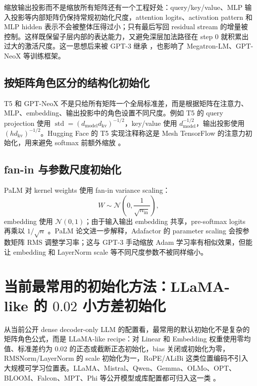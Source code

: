 \documentclass[UTF8,a4paper,11pt]{ctexart}
\newcommand{\Normal}{\mathcal{N}}
\newcommand{\std}{\operatorname{std}}
\begin{document}
缩放输出投影而不是缩放所有矩阵还有一个工程好处：query/key/value、MLP 输入投影等内部矩阵仍保持常规初始化尺度，attention logits、activation pattern 和 MLP hidden 表示不会被整体压得过小；只有最后写回 residual stream 的增量被控制。这样既保留子层内部的表达能力，又避免深层加法路径在 step 0 就积累出过大的激活尺度。这一思想后来被 GPT-3 继承 \cite{gpt3paper}，也影响了 Megatron-LM、GPT-NeoX 等训练框架。

\subsection{按矩阵角色区分的结构化初始化}

T5 和 GPT-NeoX 不是只给所有矩阵一个全局标准差，而是根据矩阵在注意力、MLP、embedding、输出投影中的角色设置不同尺度。例如 T5 的 query projection 使用 $\std=(d_{\mathrm{model}}d_{\mathrm{kv}})^{-1/2}$，key/value 使用 $d_{\mathrm{model}}^{-1/2}$，输出投影使用 $(h d_{\mathrm{kv}})^{-1/2}$。Hugging Face 的 T5 实现注释称这是 Mesh TensorFlow 的注意力初始化，用来避免 softmax 前额外缩放 \cite{t5hfcode}。

\subsection{fan-in 与参数尺度初始化}

PaLM 对 kernel weights 使用 fan-in variance scaling：
\[
  W\sim \Normal\left(0,\frac{1}{\sqrt{n_{\mathrm{in}}}}\right),
\]
embedding 使用 $\Normal(0,1)$；由于输入输出 embedding 共享，pre-softmax logits 再乘以 $1/\sqrt{n}$ \cite{palmpaper}。PaLM 论文进一步解释，Adafactor 的 parameter scaling 会按参数矩阵 RMS 调整学习率；这与 GPT-3 手动缩放 Adam 学习率有相似效果，但能让 embedding 和 LayerNorm scale 等不同尺度参数不被同样缩小。

\section{当前最常用的初始化方法：LLaMA-like 的 $0.02$ 小方差初始化}

从当前公开 dense decoder-only LLM 的配置看，最常用的默认初始化不是复杂的矩阵角色公式，而是 LLaMA-like recipe：对 Linear 和 Embedding 权重使用零均值、标准差约为 $0.02$ 的正态或截断正态初始化，bias 关闭或初始化为零，RMSNorm/LayerNorm 的 scale 初始化为一，RoPE/ALiBi 这类位置编码不引入大规模可学习位置表。LLaMA、Mistral、Qwen、Gemma、OLMo、OPT、BLOOM、Falcon、MPT、Phi 等公开模型或库配置都可归入这一类 \cite{llamadocs,mistraldocs,qwen2docs,gemmadocs,olmodocs,optdocs,bloomdocs,falcondocs,mptdocs,phidocs}。
\end{document}
